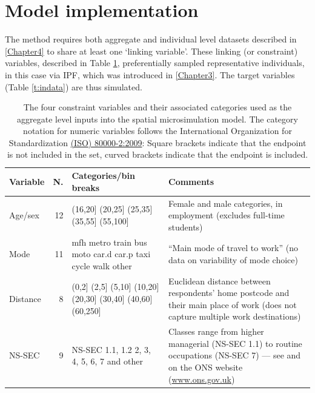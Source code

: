 \documentclass[a4paper, 11pt, twoside]{Thesis}
\begin{document}
\section{Model implementation} \label{Methods}
The method requires both aggregate and individual
level datasets described in \cref{Chapter4} to
share at least one `linking variable'. These linking (or constraint)
variables, described in Table \ref{t:constraints},
preferentially sampled representative
individuals, in this case via IPF, which was introduced in
\cref{Chapter3}. The target variables (Table
\ref{t:indata}) are thus simulated.

\begin{table}[htbp]
\caption[Aggregate level inputs into the spatial microsimulation model]
{The four constraint variables and their associated categories used as
the aggregate level inputs into the spatial microsimulation model.
The category notation for numeric variables follows
the International Organization for Standardization
\href{http://www.iso.org/iso/catalogue_detail?csnumber=31887}
{(ISO) 80000-2:2009}:
Square brackets indicate that the endpoint is not included in the set,
curved brackets indicate that the endpoint is included.}

\begin{center}
\begin{tabular}{lrp{3cm}p{8cm}}\toprule
Variable & \multicolumn{1}{l}{N. } & Categories/bin breaks & Comments \\ \midrule
Age/sex & 12 & (16,20] (20,25] (25,35] (35,55] (55,100] & Female and male categories, in employment (excludes full-time students) \\
Mode & 11 & mfh       metro     train     bus       moto      car.d     car.p
taxi      cycle     walk      other & “Main mode of travel to work” (no data on variability of mode choice) \\
Distance & 8 & (0,2] (2,5] (5,10] (10,20] (20,30] (30,40] (40,60] (60,250] &
Euclidean distance between respondents' home postcode and their main place of work (does not capture multiple work destinations) \\
NS-SEC & 9 & NS-SEC 1.1, 1.2 2, 3, 4, 5, 6, 7 and other & Classes range
from higher managerial (NS-SEC  1.1) to routine occupations (NS-SEC 7) --- see
\citep{chandola2000new} and on the ONS website
(\href{http://www.ons.gov.uk/ons/guide-method/classifications/current-standard-classifications/soc2010/soc2010-volume-3-ns-sec--rebased-on-soc2010--user-manual/index.html}{www.ons.gov.uk}) \\
\bottomrule
\end{tabular}\end{center}
\label{t:constraints}
\end{table}
\end{document}
